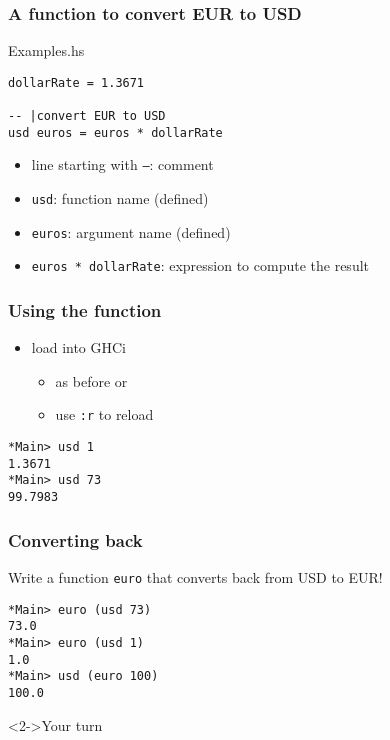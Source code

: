 \documentclass{beamer}
\begin{document}
\begin{frame}[fragile]
  \frametitle{A function to convert EUR to USD}
\begin{block}{Examples.hs}
\begin{verbatim}
dollarRate = 1.3671

-- |convert EUR to USD
usd euros = euros * dollarRate
\end{verbatim}
  \end{block}
  \begin{itemize}
  \item line starting with \texttt{--}: comment
  \item \texttt{usd}: function name (defined)
  \item \texttt{euros}:  argument name (defined)
  \item \texttt{euros * dollarRate}: expression to compute the result
  \end{itemize}
\end{frame}
\begin{frame}[fragile]
  \frametitle{Using the function}
  \begin{itemize}
  \item load into GHCi
    \begin{itemize}
    \item as before or
    \item use \texttt{:r} to reload
    \end{itemize}
  \end{itemize}
\begin{verbatim}
*Main> usd 1
1.3671
*Main> usd 73
99.7983
\end{verbatim}
\end{frame}
\begin{frame}[fragile]
  \frametitle{Converting back}
Write a function \texttt{euro} that converts back from USD to EUR!
\begin{verbatim}
*Main> euro (usd 73)
73.0
*Main> euro (usd 1)
1.0
*Main> usd (euro 100)
100.0
\end{verbatim}
\begin{alertblock}<2->{Your turn}

\end{alertblock}
\end{frame}
\end{document}
